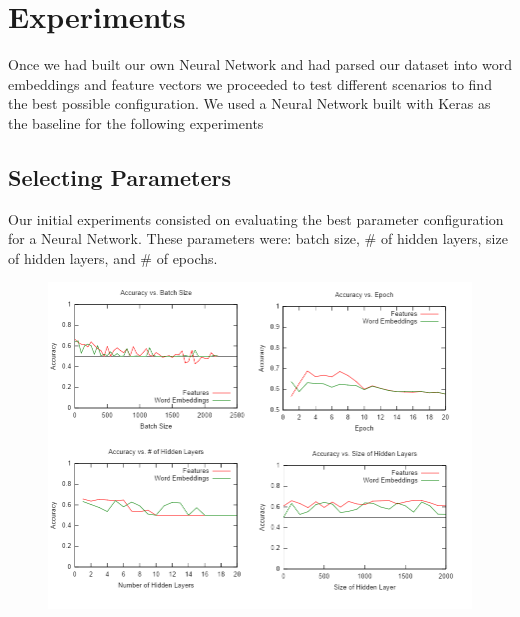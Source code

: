 \documentclass[11pt,onecolumn]{article} %
\begin{document}


\section{Experiments}
Once we had built our own Neural Network and had parsed our dataset into word embeddings and feature vectors we proceeded to test different scenarios to find the best possible configuration. We used a Neural Network built with Keras as the baseline for the following experiments



\subsection{Selecting Parameters}
Our initial experiments consisted on evaluating the best parameter configuration for a Neural Network. These parameters were: batch size, \# of hidden layers, size of hidden layers, and \# of epochs. 
\begin{figure}[t]
\centering
\includegraphics[width=1.2\linewidth]{images/all_in_one}
\caption{}
\label{fig:all_in_one}
\end{figure}
\end{document}
